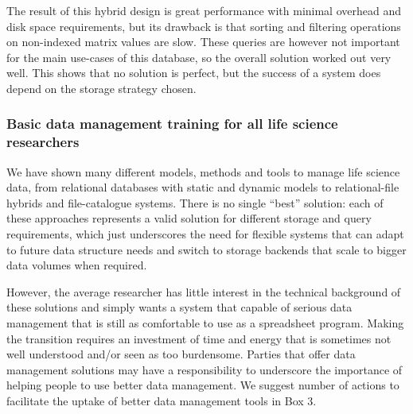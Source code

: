 The result of this hybrid design is great performance with minimal overhead and disk space requirements, but its drawback is that sorting and filtering operations on non-indexed matrix values are slow.
These queries are however not important for the main use-cases of this database, so the overall solution worked out very well.
This shows that no solution is perfect, but the success of a system does depend on the storage strategy chosen.

\subsubsection*{Basic data management training for all life science researchers}

We have shown many different models, methods and tools to manage life science data, from relational databases with static and dynamic models to relational-file hybrids and file-catalogue systems.
There is no single “best” solution: each of these approaches represents a valid solution for different storage and query requirements, which just underscores the need for flexible systems that can adapt to future data structure needs and switch to storage backends that scale to bigger data volumes when required.

However, the average researcher has little interest in the technical background of these solutions and simply wants a system that capable of serious data management that is still as comfortable to use as a spreadsheet program.
Making the transition requires an investment of time and energy that is sometimes not well understood and/or seen as too burdensome.
Parties that offer data management solutions may have a responsibility to underscore the importance of helping people to use better data management.
We suggest number of actions to facilitate the uptake of better data management tools in Box 3.

